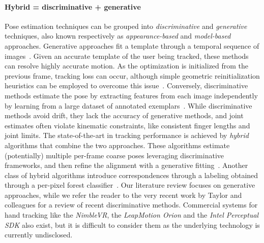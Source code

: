 \paragraph{Hybrid = discriminative + generative}
% 
Pose estimation techniques can be grouped into \emph{discriminative} and \emph{generative} techniques, also known respectively as \emph{appearance-based} and \emph{model-based} approaches.
Generative approaches fit a template through a temporal sequence of images~\cite{oiko2011hand,melax2013dynamics,schroder2014real,tagliasacchi2015robust}. Given an accurate template of the user being tracked, these methods can resolve highly accurate motion. As the optimization is initialized from the previous frame, tracking loss can occur, although simple geometric reinitialization heuristics can be employed to overcome this issue~\cite{melax2013dynamics,qian2014realtime}. 
Conversely, discriminative methods estimate the pose by extracting features from each image independently by learning from a large dataset of annotated exemplars~\cite{keskin2012hand,tang2013real,tejani2014latent,sun2015cascaded}.
While discriminative methods avoid drift, they lack the accuracy of generative methods, and joint estimates often violate kinematic constraints, like consistent finger lengths and joint limits.
The state-of-the-art in tracking performance is achieved by \emph{hybrid} algorithms that combine the two approaches. These algorithms estimate (potentially) multiple per-frame coarse poses leveraging discriminative frameworks, and then refine the alignment with a generative fitting~\cite{tompson2014real,qian2014realtime,sharp2015accurate}.
Another class of hybrid algorithms introduce correspondences through a labeling obtained through a per-pixel forest  classifier~\cite{sridhar2015fast,fleishman2015icpik}.
% 
Our literature review focuses on generative approaches, while we refer the reader to the very recent work by Taylor and colleagues  for a review of recent discriminative methods. Commercial systems for hand tracking like the \emph{NimbleVR\textcopyright}, the \emph{LeapMotion Orion\textcopyright} and the \emph{Intel Perceptual SDK\textcopyright} also exist, but it is difficult to consider them as the underlying technology is currently undisclosed. 

